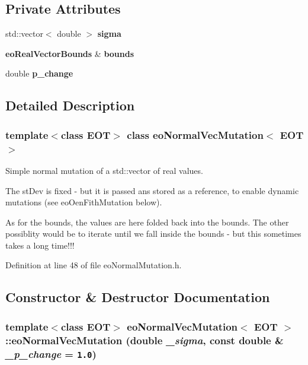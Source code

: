 \subsection*{Private Attributes}
\begin{CompactItemize}
\item 
std::vector$<$ double $>$ {\bf sigma}\label{classeo_normal_vec_mutation_r0}

\item 
{\bf eo\-Real\-Vector\-Bounds} \& {\bf bounds}\label{classeo_normal_vec_mutation_r1}

\item 
double {\bf p\_\-change}\label{classeo_normal_vec_mutation_r2}

\end{CompactItemize}


\subsection{Detailed Description}
\subsubsection*{template$<$class EOT$>$ class eo\-Normal\-Vec\-Mutation$<$ EOT $>$}

Simple normal mutation of a std::vector of real values. 

The st\-Dev is fixed - but it is passed ans stored as a reference, to enable dynamic mutations (see eo\-Oen\-Fith\-Mutation below).

As for the bounds, the values are here folded back into the bounds. The other possiblity would be to iterate until we fall inside the bounds - but this sometimes takes a long time!!! 



Definition at line 48 of file eo\-Normal\-Mutation.h.

\subsection{Constructor \& Destructor Documentation}
\subsubsection{\setlength{\rightskip}{0pt plus 5cm}template$<$class EOT$>$ {\bf eo\-Normal\-Vec\-Mutation}$<$ {\bf EOT} $>$::{\bf eo\-Normal\-Vec\-Mutation} (double {\em \_\-sigma}, const double \& {\em \_\-p\_\-change} = {\tt 1.0})\hspace{0.3cm}{\tt  [inline]}}\label{classeo_normal_vec_mutation_a0}


